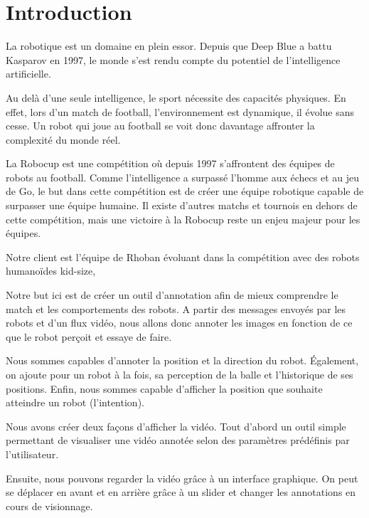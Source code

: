 
\chapter{Introduction}

La robotique est un domaine en plein essor. Depuis que Deep Blue a battu Kasparov en 1997, le monde s'est rendu compte du potentiel de l'intelligence artificielle.
\bigskip

Au delà d'une seule intelligence, le sport nécessite des capacités physiques. En effet, lors d'un match de football, l'environnement est dynamique, il évolue sans cesse. Un robot qui joue au football se voit donc davantage affronter la complexité du monde réel.
\bigskip

La Robocup est une compétition où depuis 1997 s'affrontent des équipes de robots au football. 
Comme l'intelligence a surpassé l'homme aux échecs et au jeu de Go, le but dans cette compétition est de créer une équipe robotique capable de surpasser une équipe humaine.
Il existe d'autres matchs et tournois en dehors de cette compétition, mais une victoire à la Robocup reste un enjeu majeur pour les équipes.
\bigskip

Notre client est l'équipe de Rhoban évoluant dans la compétition avec des robots humanoïdes kid-size, 

Notre but ici est de créer un outil d'annotation afin de mieux comprendre le match et les comportements des robots. A partir des messages envoyés par les robots et d'un flux vidéo, nous allons donc annoter les images en fonction de ce que le robot perçoit et essaye de faire.
\bigskip

Nous sommes capables d'annoter la position et la direction du robot. Également, on ajoute pour un robot à la fois, sa perception de la balle et l'historique de ses positions. Enfin, nous sommes capable d'afficher la position que souhaite atteindre un robot (l'intention).
\bigskip

Nous avons créer deux façons d'afficher la vidéo. Tout d'abord un outil simple permettant de visualiser une vidéo annotée selon des paramètres prédéfinis par l'utilisateur.
\bigskip

Ensuite, nous pouvons regarder la vidéo grâce à un interface graphique. On peut se déplacer en avant et en arrière grâce à un slider et changer les annotations en cours de visionnage.


